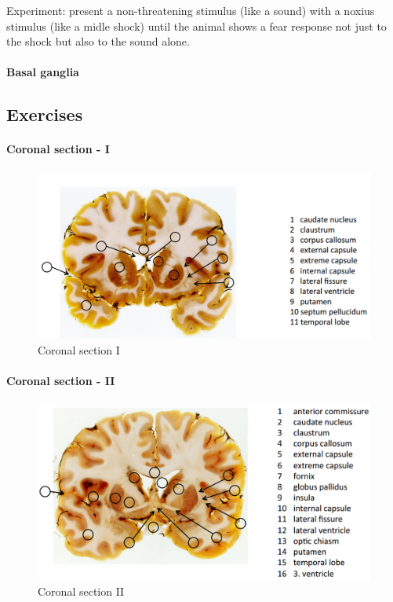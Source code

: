 \documentclass[12pt,article,oneside,a4paper]{memoir}
\begin{document}
Experiment: present a non-threatening stimulus (like a sound) with a noxius stimulus (like a midle shock) until the animal shows a fear response not just to the shock but also to the sound alone.

\paragraph{Basal ganglia}

\subsection{Exercises}

\paragraph{Coronal section - I}
\begin{figure}[H]
	\centering
  	\includegraphics[width=\linewidth]{imgs/coronal-section-I.png}
	\caption{Coronal section I}
  	\label{fig:coronalSectionI}
\end{figure}

\paragraph{Coronal section - II}
\begin{figure}[H]
	\centering
  	\includegraphics[width=\linewidth]{imgs/coronal-section-II.png}
	\caption{Coronal section II}
  	\label{fig:coronalSectionI}
\end{figure}
\end{document}
